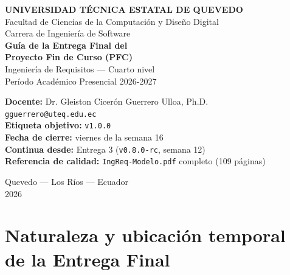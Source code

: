 \documentclass[11pt,a4paper]{article}
\begin{document}
\begin{center}
    \vspace*{1.2cm}
    {\Large\bfseries\textcolor{uteqverde}{UNIVERSIDAD T\'ECNICA ESTATAL DE QUEVEDO}}\\[4pt]
    {\large Facultad de Ciencias de la Computaci\'on y Dise\~no Digital}\\[2pt]
    {\large Carrera de Ingenier\'ia de Software}\\[22pt]

    {\LARGE\bfseries Gu\'ia de la Entrega Final del}\\[6pt]
    {\LARGE\bfseries Proyecto Fin de Curso (PFC)}\\[16pt]

    {\large Ingenier\'ia de Requisitos --- Cuarto nivel}\\[2pt]
    {\large Per\'iodo Acad\'emico Presencial 2026-2027}\\[22pt]

    \begin{tcolorbox}[colback=uteqverde!8,colframe=uteqverde,arc=3pt,
                      width=0.88\textwidth,boxrule=0.8pt]
        \centering
        \textbf{Docente:} Dr. Gleiston Cicer\'on Guerrero Ulloa, Ph.D.\\[2pt]
        \texttt{gguerrero@uteq.edu.ec}\\[6pt]
        \textbf{Etiqueta objetivo:} \texttt{v1.0.0}\\[2pt]
        \textbf{Fecha de cierre:} viernes de la semana 16\\[2pt]
        \textbf{Continua desde:} Entrega 3 (\texttt{v0.8.0-rc}, semana 12)\\[2pt]
        \textbf{Referencia de calidad:} \texttt{IngReq-Modelo.pdf} completo (109 p\'aginas)
    \end{tcolorbox}

    \vfill
    {\small Quevedo --- Los R\'ios --- Ecuador}\\[2pt]
    {\small 2026}
\end{center}

\newpage
\tableofcontents
\newpage

\section{Naturaleza y ubicaci\'on temporal de la Entrega Final}
\end{document}
